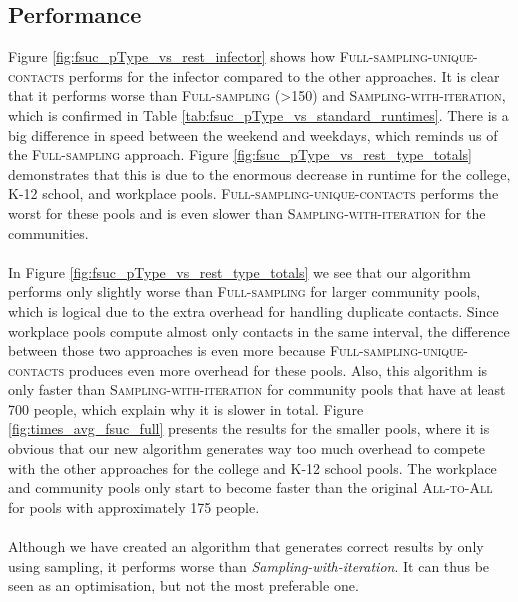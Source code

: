 \subsection{Performance}
\label{subsec:performance_full_sampling_unique_contacts}
Figure \ref{fig:fsuc_pType_vs_rest_infector} shows how \textsc{Full-sampling-unique-contacts} performs for the infector compared to the other approaches. It is clear that it performs worse than \textsc{Full-sampling (>150)} and \textsc{Sampling-with-iteration}, which is confirmed in Table \ref{tab:fsuc_pType_vs_standard_runtimes}. There is a big difference in speed between the weekend and weekdays, which reminds us of the \textsc{Full-sampling} approach. Figure \ref{fig:fsuc_pType_vs_rest_type_totals} demonstrates that this is due to the enormous decrease in runtime for the college, K-12 school, and workplace pools. \textsc{Full-sampling-unique-contacts} performs the worst for these pools and is even slower than \textsc{Sampling-with-iteration} for the communities.
\\\\
In Figure \ref{fig:fsuc_pType_vs_rest_type_totals} we see that our algorithm performs only slightly worse than \textsc{Full-sampling} for larger community pools, which is logical due to the extra overhead for handling duplicate contacts. Since workplace pools compute almost only contacts in the same interval, the difference between those two approaches is even more because \textsc{Full-sampling-unique-contacts} produces even more overhead for these pools. Also, this algorithm is only faster than \textsc{Sampling-with-iteration} for community pools that have at least 700 people, which explain why it is slower in total. Figure \ref{fig:times_avg_fsuc_full} presents the results for the smaller pools, where it is obvious that our new algorithm generates way too much overhead to compete with the other approaches for the college and K-12 school pools. The workplace and community pools only start to become faster than the original \textsc{All-to-All} for pools with approximately 175 people.
\\\\
Although we have created an algorithm that generates correct results by only using sampling, it performs worse than \textit{Sampling-with-iteration}. It can thus be seen as an optimisation, but not the most preferable one.

